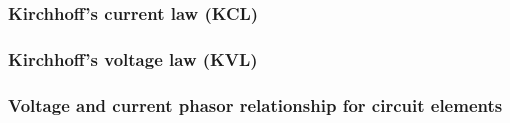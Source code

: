 \documentclass{article}
\begin{document}
\subsubsection{Kirchhoff's current law (KCL)}

\subsubsection{Kirchhoff's voltage law (KVL)}

\subsubsection{Voltage and current phasor relationship for circuit elements}
\end{document}
